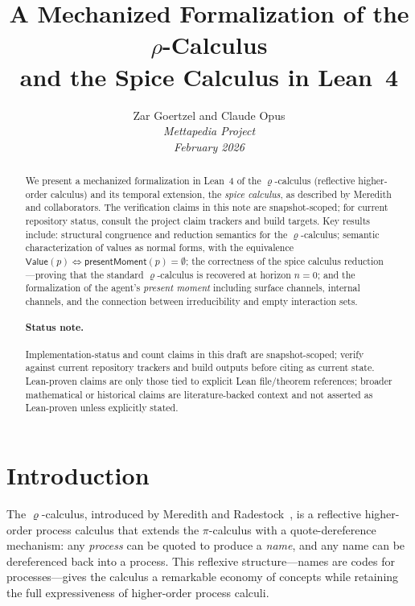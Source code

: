 \documentclass[11pt,a4paper]{article}
\title{%
  \textbf{A Mechanized Formalization of the $\rho$-Calculus\\
  and the Spice Calculus in Lean~4}
}
\author{%
  Zar Goertzel and Claude Opus \\
  {\small \textit{Mettapedia Project}} \\
  {\small \textit{February 2026}}
}
\date{}
\theoremstyle{definition}
\theoremstyle{remark}
\renewcommand{\rho}{\varrho}
\begin{document}
\maketitle

\begin{abstract}
We present a mechanized formalization in Lean~4 of the $\rho$-calculus (reflective
higher-order calculus) and its temporal extension, the \emph{spice calculus}, as
described by Meredith and collaborators.
The verification claims in this note are snapshot-scoped; for current repository
status, consult the project claim trackers and build targets.
Key results include:
structural congruence and reduction semantics for the $\rho$-calculus;
semantic characterization of values as normal forms, with the equivalence
$\mathsf{Value}(p) \iff \mathsf{presentMoment}(p) = \emptyset$;
the correctness of the spice calculus reduction---proving that the standard
$\rho$-calculus is recovered at horizon $n = 0$;
and the formalization of the agent's \emph{present moment} including surface
channels, internal channels, and the connection between irreducibility
and empty interaction sets.
\paragraph{Status note.} Implementation-status and count claims in this draft are snapshot-scoped; verify against current repository trackers and build outputs before citing as current state. Lean-proven claims are only those tied to explicit Lean file/theorem references; broader mathematical or historical claims are literature-backed context and not asserted as Lean-proven unless explicitly stated.
\end{abstract}

\section{Introduction}
\label{sec:intro}

The $\rho$-calculus, introduced by Meredith and Radestock~\cite{meredith2005},
is a reflective higher-order process calculus that extends the $\pi$-calculus
with a quote-dereference mechanism: any \emph{process} can be quoted to produce
a \emph{name}, and any name can be dereferenced back into a process. This
reflexive structure---names are codes for processes---gives the calculus a
remarkable economy of concepts while retaining the full expressiveness of
higher-order process calculi.
\end{document}
